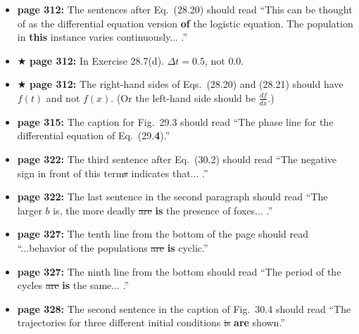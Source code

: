 \documentclass[12pt]{article}
\begin{document}
\begin{itemize}
  \item {\bf page 312:}  The sentences after Eq.~(28.20) should read
    ``This can be thought of as the differential equation version {\bf
    of} the logistic equation.  The population in {\bf this} instance
    varies continuously... .''

  \item $\bigstar$ {\bf page 312:}  In Exercise 28.7(d).  $\Delta t =
    0.5$, not $0.0$.   

  \item $\bigstar$ {\bf page 312:}  The right-hand sides of
    Eqs.~(28.20) and (28.21) should have $f(t)$ and not $f(x)$.  (Or
    the left-hand side should be $\frac{df}{dx}$.)

  \item {\bf page 315:}  The caption for Fig.~29.3 should read ``The
    phase line for the differential equation of Eq.~(29.{\bf 4}).'' 

  \item {\bf page 322:}  The third sentence after Eq.~(30.2) should
    read ``The negative sign in front of this term\sout{s} indicates
    that... .''

  \item {\bf page 322:}  The last sentence in the second paragraph
    should read ``The larger $b$ is, the more deadly \sout{are} {\bf
      is} the presence of foxes... .''


  \item {\bf page 327:}  The tenth line from the bottom of the page
    should read ``...behavior of the populations \sout{are} {\bf is}
    cyclic.'' 

  \item {\bf page 327:}  The ninth line from the bottom should read
    ``The period of the cycles \sout{are} {\bf is} the same... .''

  \item {\bf page 328:}  The second sentence in the caption of
    Fig.~30.4 should read ``The trajectories for three different
    initial conditions \sout{is} {\bf are} shown.'' 



\end{itemize}
\end{document}
